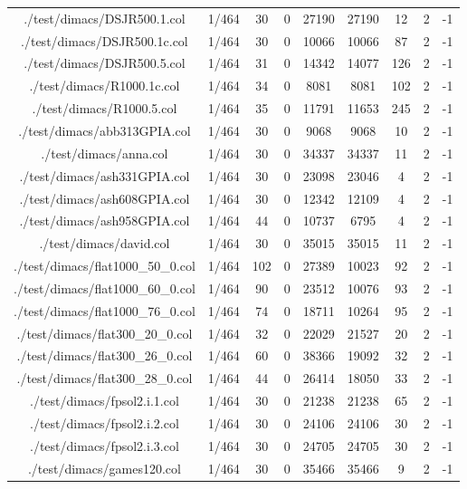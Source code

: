 \begin{table}[htb]
\begin{tabular}{@{}ccccccccc@{}}
        ./test/dimacs/DSJR500.1.col & 1/464 & 30 & 0 & 27190 & 27190 & 12 & 2 & -1 \\
        ./test/dimacs/DSJR500.1c.col & 1/464 & 30 & 0 & 10066 & 10066 & 87 & 2 & -1 \\
        ./test/dimacs/DSJR500.5.col & 1/464 & 31 & 0 & 14342 & 14077 & 126 & 2 & -1 \\
        ./test/dimacs/R1000.1c.col & 1/464 & 34 & 0 & 8081 & 8081 & 102 & 2 & -1 \\
        ./test/dimacs/R1000.5.col & 1/464 & 35 & 0 & 11791 & 11653 & 245 & 2 & -1 \\
        ./test/dimacs/abb313GPIA.col & 1/464 & 30 & 0 & 9068 & 9068 & 10 & 2 & -1 \\
        ./test/dimacs/anna.col & 1/464 & 30 & 0 & 34337 & 34337 & 11 & 2 & -1 \\
        ./test/dimacs/ash331GPIA.col & 1/464 & 30 & 0 & 23098 & 23046 & 4 & 2 & -1 \\
        ./test/dimacs/ash608GPIA.col & 1/464 & 30 & 0 & 12342 & 12109 & 4 & 2 & -1 \\
        ./test/dimacs/ash958GPIA.col & 1/464 & 44 & 0 & 10737 & 6795 & 4 & 2 & -1 \\
        ./test/dimacs/david.col & 1/464 & 30 & 0 & 35015 & 35015 & 11 & 2 & -1 \\
        ./test/dimacs/flat1000\_50\_0.col & 1/464 & 102 & 0 & 27389 & 10023 & 92 & 2 & -1 \\
        ./test/dimacs/flat1000\_60\_0.col & 1/464 & 90 & 0 & 23512 & 10076 & 93 & 2 & -1 \\
        ./test/dimacs/flat1000\_76\_0.col & 1/464 & 74 & 0 & 18711 & 10264 & 95 & 2 & -1 \\
        ./test/dimacs/flat300\_20\_0.col & 1/464 & 32 & 0 & 22029 & 21527 & 20 & 2 & -1 \\
        ./test/dimacs/flat300\_26\_0.col & 1/464 & 60 & 0 & 38366 & 19092 & 32 & 2 & -1 \\
        ./test/dimacs/flat300\_28\_0.col & 1/464 & 44 & 0 & 26414 & 18050 & 33 & 2 & -1 \\
        ./test/dimacs/fpsol2.i.1.col & 1/464 & 30 & 0 & 21238 & 21238 & 65 & 2 & -1 \\
        ./test/dimacs/fpsol2.i.2.col & 1/464 & 30 & 0 & 24106 & 24106 & 30 & 2 & -1 \\
        ./test/dimacs/fpsol2.i.3.col & 1/464 & 30 & 0 & 24705 & 24705 & 30 & 2 & -1 \\
        ./test/dimacs/games120.col & 1/464 & 30 & 0 & 35466 & 35466 & 9 & 2 & -1 \\

\end{tabular}
\end{table}
